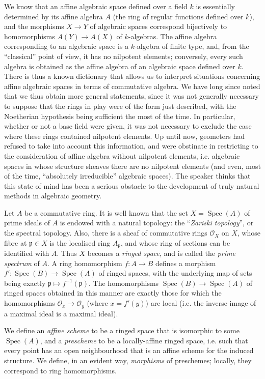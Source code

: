 \documentclass{article}
\newcommand{\scr}[1]{{\mathscr{#1}}}
\newcommand{\fk}{\mathfrak}
\DeclareMathOperator{\Spec}{Spec}
\newcommand{\oldpage}[1]{\marginpar{\footnotesize$\Big\vert$ \textit{p.~#1}}}
\begin{document}
\oldpage{182-01}
We know that an affine algebraic space defined over a field $k$ is essentially determined by its affine algebra $A$ (the ring of regular functions defined over $k$), and the morphisms $X\to Y$ of algebraic spaces correspond bijectively to homomorphisms $A(Y)\to A(X)$ of $k$-algebras.
The affine algebra corresponding to an algebraic space is a $k$-algebra of finite type, and, from the ``classical'' point of view, it has no nilpotent elements;
conversely, every such algebra is obtained as the affine algebra of an algebraic space defined over $k$.
There is thus a known dictionary that allows us to interpret situations concerning affine algebraic spaces in terms of commutative algebra.
We have long since noted that we thus obtain more general statements, since it was not generally necessary to suppose that the rings in play were of the form just described, with the Noetherian hypothesis being sufficient the most of the time.
In particular, whether or not a base field were given, it was not necessary to exclude the case where these rings contained nilpotent elements.
Up until now, geometers had refused to take into account this information, and were obstinate in restricting to the consideration of affine algebra without nilpotent elements, i.e. algebraic spaces in whose structure sheaves there are no nilpotent elements (and even, most of the time, ``absolutely irreducible'' algebraic spaces).
The speaker thinks that this state of mind has been a serious obstacle to the development of truly natural methods in algebraic geometry.

Let $A$ be a commutative ring.
It is well known that the set $X=\Spec(A)$ of prime ideals of $A$ is endowed with a natural topology: the ``\emph{Zariski topology}'', or the spectral topology.
Also, there is a sheaf of commutative rings $\scr{O}_X$ on $X$, whose fibre at $\fk{p}\in X$ is the localised ring $A_\fk{p}$, and whose ring of sections can be identified with $A$.
Thus $X$ becomes a \emph{ringed space}, and is called the \emph{prime spectrum} of $A$.
A ring homomorphism $f\colon A\to B$ defines a morphism $f'\colon\Spec(B)\to\Spec(A)$ of ringed spaces, with the underlying map of sets being exactly $\fk{p}\mapsto f^{-1}(\fk{p})$.
The homomorphisms
\oldpage{182-02}
$\Spec(B)\to\Spec(A)$ of ringed spaces obtained in this manner are exactly those for which the homomorphisms $\scr{O}_x\to\scr{O}_y$ (where $x=f'(y)$) are local (i.e. the inverse image of a maximal ideal is a maximal ideal).

We define an \emph{affine scheme} to be a ringed space that is isomorphic to some $\Spec(A)$, and a \emph{prescheme} to be a locally-affine ringed space, i.e. such that every point has an open neighbourhood that is an affine scheme for the induced structure.
We define, in an evident way, \emph{morphisms} of preschemes;
locally, they correspond to ring homomorphisms.
\end{document}
